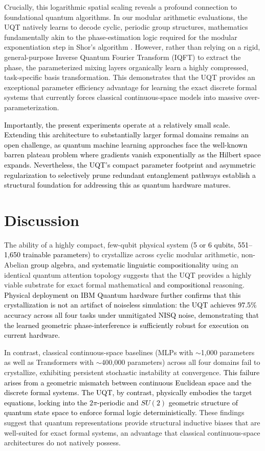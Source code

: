 \documentclass[11pt, a4paper]{article}
\begin{document}
Crucially, this logarithmic spatial scaling reveals a profound connection to foundational quantum algorithms. In our modular arithmetic evaluations, the UQT natively learns to decode cyclic, periodic group structures, mathematics fundamentally akin to the phase-estimation logic required for the modular exponentiation step in Shor's algorithm \cite{shor1999polynomial}. However, rather than relying on a rigid, general-purpose Inverse Quantum Fourier Transform (IQFT) to extract the phase, the parameterized mixing layers organically learn a highly compressed, task-specific basis transformation. This demonstrates that the UQT provides an exceptional parameter efficiency advantage for learning the exact discrete formal systems that currently forces classical continuous-space models into massive over-parameterization.

\textcolor{black}{{Importantly, the present experiments operate at a relatively small scale. Extending this architecture to substantially larger formal domains remains an open challenge, as quantum machine learning approaches face the well-known barren plateau problem where gradients vanish exponentially as the Hilbert space expands. Nevertheless, the UQT's compact parameter footprint and asymmetric regularization to selectively prune redundant entanglement pathways establish a structural foundation for addressing this as quantum hardware matures.}}

\section*{Discussion}
The ability of a highly compact, few-qubit physical system \textcolor{black}{(5 or 6 qubits, 551--1,650 trainable parameters)} to crystallize across cyclic modular arithmetic, non-Abelian \textcolor{black}{group algebra, and systematic linguistic compositionality} using an identical quantum attention topology suggests that the UQT provides a highly viable substrate for exact formal mathematical \textcolor{black}{and compositional} reasoning. \textcolor{black}{Physical deployment on IBM Quantum hardware further confirms that this crystallization is not an artifact of noiseless simulation: the UQT achieves 97.5\% accuracy across all four tasks under unmitigated NISQ noise, demonstrating that the learned geometric phase-interference is sufficiently robust for execution on current hardware.}

In contrast, classical continuous-space baselines (MLPs with ${\sim}$1,000 parameters as well as Transformers with ${\sim}$400,000 parameters) across all four domains fail to crystallize, exhibiting persistent stochastic instability at convergence. \textcolor{black}{This failure arises from a geometric mismatch between continuous Euclidean space and the discrete formal systems. The UQT, by contrast, physically embodies the target equations, locking into the $2\pi$-periodic and $SU(2)$ geometric structure of quantum state space to enforce formal logic deterministically.} These findings suggest that quantum representations provide structural inductive biases that are well-suited for exact formal systems, an advantage that classical continuous-space architectures do not natively possess.
\end{document}
